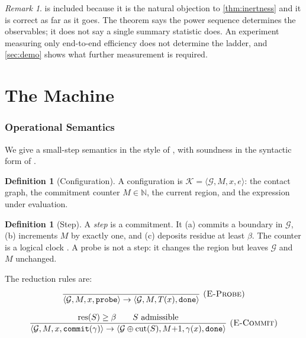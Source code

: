 \documentclass[11pt,twocolumn,a4paper]{article}
\theoremstyle{plain}
\theoremstyle{definition}
\newtheorem{definition}[theorem]{Definition}
\theoremstyle{remark}
\newtheorem{remark}[theorem]{Remark}
\newcommand{\N}{\mathbb{N}}
\newcommand{\Gph}{\mathcal{G}}
\newcommand{\cut}{\operatorname{cut}}
\newcommand{\res}{\operatorname{res}}
\newcommand{\flo}{\beta}
\newcommand{\Rung}{\gamma}
\newcommand{\Conf}{\mathcal{K}}
\begin{document}
\begin{remark}
 is included because it is the natural objection to
\cref{thm:inertness} and it is correct as far as it goes. The theorem says the
power sequence determines the observables; it does not say a single summary
statistic does. An experiment measuring only end-to-end efficiency does not
determine the ladder, and \cref{sec:demo} shows what further measurement is
required.
\end{remark}

\part{The Machine}
\label{part:machine}

\section{Operational Semantics}
\label{sec:semantics}

We give a small-step semantics in the style of \citet{plotkin1981}, with
soundness in the syntactic form of \citet{wright1994}.

\begin{definition}[Configuration]
\label{def:config}
A configuration is $\Conf = \langle \Gph, M, x, e \rangle$: the contact graph,
the commitment counter $M \in \N$, the current region, and the expression under
evaluation.
\end{definition}

\begin{definition}[Step]
\label{def:step}
A \emph{step} is a commitment. It (a) commits a boundary in $\Gph$, (b)
increments $M$ by exactly one, and (c) deposits residue at least $\flo$. The
counter is a logical clock \citep{lamport1978}. A probe is not a step: it
changes the region but leaves $\Gph$ and $M$ unchanged.
\end{definition}

The reduction rules are:
\[
\frac{}{\langle \Gph, M, x, \texttt{probe}\rangle \to
        \langle \Gph, M, T(x), \texttt{done}\rangle}
\ \textsc{(E-Probe)}
\]

\[
\frac{\res(S) \geq \flo \qquad S \text{ admissible}}
     {\langle \Gph, M, x, \texttt{commit}(\Rung)\rangle \to
      \langle \Gph \oplus \cut(S), M{+}1, \Rung(x), \texttt{done}\rangle}
\ \textsc{(E-Commit)}
\]
\end{document}
